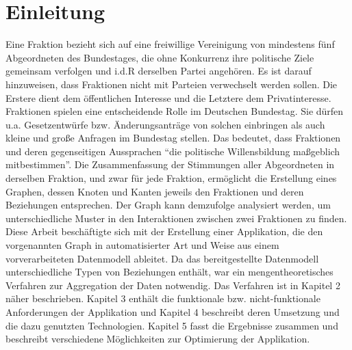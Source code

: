 \section{Einleitung}\label{sec:06_01_einleitung}
Eine Fraktion bezieht sich auf eine freiwillige Vereinigung von mindestens fünf Abgeordneten des Bundestages, die ohne Konkurrenz
ihre politische Ziele gemeinsam verfolgen und i.d.R derselben Partei angehören.
Es ist darauf hinzuweisen, dass Fraktionen nicht mit Parteien verwechselt werden sollen. Die Erstere dient dem öffentlichen Interesse und die Letztere dem Privatinteresse.
Fraktionen spielen eine entscheidende Rolle im Deutschen Bundestag. 
Sie dürfen u.a. Gesetzentwürfe bzw. Änderungsanträge von solchen einbringen als auch kleine und große Anfragen im Bundestag stellen. 
Das bedeutet, dass Fraktionen und deren gegenseitigen Aussprachen ``die politische Willensbildung maßgeblich mitbestimmen''.\newline 
Die Zusammenfassung der Stimmungen aller Abgeordneten in derselben Fraktion, und zwar für jede Fraktion, ermöglicht
die Erstellung eines Graphen, dessen Knoten und Kanten jeweils den Fraktionen und deren Beziehungen entsprechen. 
Der Graph kann demzufolge analysiert werden, um unterschiedliche Muster in den Interaktionen zwischen zwei Fraktionen zu finden.
Diese Arbeit beschäftigte sich mit der Erstellung einer Applikation, die den vorgenannten Graph in automatisierter Art und Weise aus einem vorverarbeiteten Datenmodell ableitet.\newline 
Da das bereitgestellte Datenmodell unterschiedliche Typen von Beziehungen enthält, war ein mengentheoretisches Verfahren zur Aggregation der Daten notwendig. Das Verfahren ist in Kapitel 2 näher beschrieben. 
Kapitel 3 enthält die funktionale bzw. nicht-funktionale Anforderungen der Applikation und Kapitel 4 beschreibt deren Umsetzung und die dazu genutzten Technologien. 
Kapitel 5 fasst die Ergebnisse zusammen und beschreibt verschiedene Möglichkeiten zur Optimierung der Applikation.  


